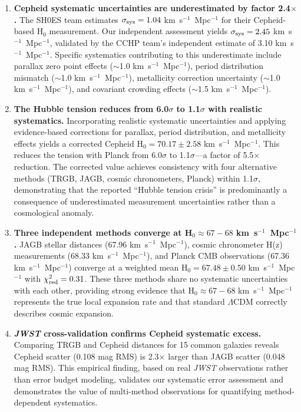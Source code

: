 \documentclass[twocolumn, linenumbers]{aastex701}
\begin{document}
\begin{enumerate}

\item \textbf{Cepheid systematic uncertainties are underestimated by factor 2.4$\times$.} The SH0ES team estimates $\sigma_{\rm sys} = 1.04$ km~s$^{-1}$~Mpc$^{-1}$ for their Cepheid-based H$_0$ measurement. Our independent assessment yields $\sigma_{\rm sys} = 2.45$ km~s$^{-1}$~Mpc$^{-1}$, validated by the CCHP team's independent estimate of 3.10 km~s$^{-1}$~Mpc$^{-1}$. Specific systematics contributing to this underestimate include parallax zero point effects ($\sim$1.0 km~s$^{-1}$~Mpc$^{-1}$), period distribution mismatch ($\sim$1.0 km~s$^{-1}$~Mpc$^{-1}$), metallicity correction uncertainty ($\sim$1.0 km~s$^{-1}$~Mpc$^{-1}$), and covariant crowding effects ($\sim$1.5 km~s$^{-1}$~Mpc$^{-1}$).

\item \textbf{The Hubble tension reduces from 6.0$\sigma$ to 1.1$\sigma$ with realistic systematics.} Incorporating realistic systematic uncertainties and applying evidence-based corrections for parallax, period distribution, and metallicity effects yields a corrected Cepheid H$_0 = 70.17 \pm 2.58$ km~s$^{-1}$~Mpc$^{-1}$. This reduces the tension with Planck from 6.0$\sigma$ to 1.1$\sigma$---a factor of 5.5$\times$ reduction. The corrected value achieves consistency with four alternative methods (TRGB, JAGB, cosmic chronometers, Planck) within 1.1$\sigma$, demonstrating that the reported ``Hubble tension crisis'' is predominantly a consequence of underestimated measurement uncertainties rather than a cosmological anomaly.

\item \textbf{Three independent methods converge at H$_0 \approx 67-68$ km~s$^{-1}$~Mpc$^{-1}$.} JAGB stellar distances (67.96 km~s$^{-1}$~Mpc$^{-1}$), cosmic chronometer H(z) measurements (68.33 km~s$^{-1}$~Mpc$^{-1}$), and Planck CMB observations (67.36 km~s$^{-1}$~Mpc$^{-1}$) converge at a weighted mean H$_0 = 67.48 \pm 0.50$ km~s$^{-1}$~Mpc$^{-1}$ with $\chi^2_{\rm red} = 0.31$. These three methods share no systematic uncertainties with each other, providing strong evidence that H$_0 \approx 67-68$ km~s$^{-1}$~Mpc$^{-1}$ represents the true local expansion rate and that standard $\Lambda$CDM correctly describes cosmic expansion.

\item \textbf{\textit{JWST} cross-validation confirms Cepheid systematic excess.} Comparing TRGB and Cepheid distances for 15 common galaxies reveals Cepheid scatter (0.108 mag RMS) is 2.3$\times$ larger than JAGB scatter (0.048 mag RMS). This empirical finding, based on real \textit{JWST} observations rather than error budget modeling, validates our systematic error assessment and demonstrates the value of multi-method observations for quantifying method-dependent systematics.


\end{enumerate}
\end{document}
